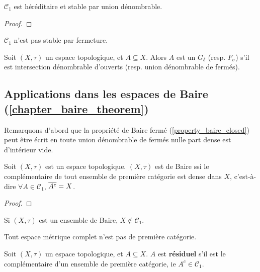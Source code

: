 \begin{proposition}
	$\mathcal{C}_{1}$ est héréditaire et stable par union
	dénombrable.
\end{proposition}

\begin{proof}
	
\end{proof}

\begin{remarque}
	$\mathcal{C}_{1}$ n'est pas stable par fermeture.
\end{remarque}

\begin{definition}
	Soit $(X, \tau)$ un espace topologique, et $A \subseteq X$.
	Alors $A$ est un $G_{\delta}$ (resp. $F_{\sigma}$) s'il est intersection
	dénombrable d'ouverts (resp. union dénombrable de fermés).
\end{definition}

\subsection{Applications dans les espaces de Baire (\ref{chapter_baire_theorem})}

Remarquons d'abord que la propriété de Baire fermé
(\ref{property_baire_closed}) peut être écrit en toute union dénombrable
de fermés nulle part dense est d'intérieur vide.

\begin{proposition}
	Soit $(X, \tau)$ est un espace topologique.
	$(X, \tau)$ est de Baire ssi le complémentaire de tout ensemble de première
	catégorie est dense dans $X$, c'est-à-dire $\forall A \in \mathcal{C}_{1}$,
	$\overline{A^{c}} = X$.
\end{proposition}

\begin{proof}
	
\end{proof}

\begin{corollary}
	Si $(X, \tau)$ est un ensemble de Baire, $X \notin \mathcal{C}_{1}$.
\end{corollary}

\begin{corollary}
	Tout espace métrique complet n'est pas de première catégorie.
\end{corollary}

\begin{definition}
	Soit $(X, \tau)$ un espace topologique, et $A \subseteq X$.
	$A$ est \textbf{résiduel} s'il est le complémentaire d'un ensemble de
	première catégorie, ie $A^{c} \in \mathcal{C}_{1}$.
\end{definition}

